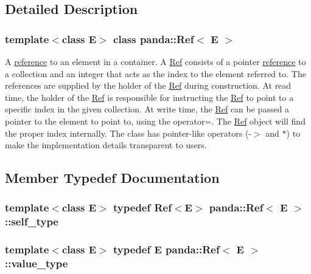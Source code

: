 \subsection{Detailed Description}
\subsubsection*{template$<$class E$>$ class panda::Ref$<$ E $>$}

A \hyperlink{namespacepanda_1_1reference}{reference} to an element in a container. A \hyperlink{classpanda_1_1Ref}{Ref} consists of a pointer \hyperlink{namespacepanda_1_1reference}{reference} to a collection and an integer that acts as the index to the element referred to. The references are supplied by the holder of the \hyperlink{classpanda_1_1Ref}{Ref} during construction. At read time, the holder of the \hyperlink{classpanda_1_1Ref}{Ref} is responsible for instructing the \hyperlink{classpanda_1_1Ref}{Ref} to point to a specific index in the given collection. At write time, the \hyperlink{classpanda_1_1Ref}{Ref} can be passed a pointer to the element to point to, using the operator=. The \hyperlink{classpanda_1_1Ref}{Ref} object will find the proper index internally. The class has pointer-\/like operators (-\/$>$ and $\ast$) to make the implementation details transparent to users. 

\subsection{Member Typedef Documentation}
\hypertarget{classpanda_1_1Ref_a4c030eb694aecfb39db76a6e5d536065}{
\subsubsection[{self\_\-type}]{\setlength{\rightskip}{0pt plus 5cm}template$<$class E$>$ typedef {\bf Ref}$<$E$>$ {\bf panda::Ref}$<$ E $>$::{\bf self\_\-type}}}
\label{classpanda_1_1Ref_a4c030eb694aecfb39db76a6e5d536065}
\hypertarget{classpanda_1_1Ref_a52b7615b884eb959c20ef4fd8f23ded0}{
\subsubsection[{value\_\-type}]{\setlength{\rightskip}{0pt plus 5cm}template$<$class E$>$ typedef E {\bf panda::Ref}$<$ E $>$::{\bf value\_\-type}}}
\label{classpanda_1_1Ref_a52b7615b884eb959c20ef4fd8f23ded0}


